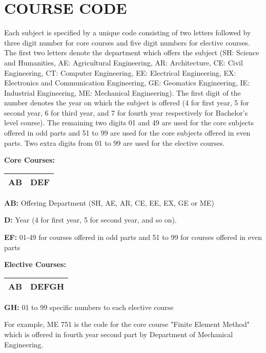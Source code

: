 \section{\uppercase{Course Code}}
Each subject is specified by a unique code consisting of two letters followed by three digit number for core courses and five digit numbers for elective courses. The first two letters denote the department which offers the subject (SH: Science and Humanities, AE: Agricultural Engineering, AR: Architecture, CE: Civil Engineering, CT: Computer Engineering, EE: Electrical Engineering, EX: Electronics and Communication Engineering, GE: Geomatics Engineering, IE: Industrial Engineering, ME: Mechanical Engineering). The first digit of the number denotes the year on which the subject is offered (4 for first year, 5 for second year, 6 for third year, and 7 for fourth year respectively for Bachelor's level course). The remaining two digits 01 and 49 are used for the core subjects offered in odd parts and 51 to 99 are used for the core subjects offered in even parts. Two extra digits from 01 to 99 are used for the elective courses.
\par
\vspace{1cm}
\noindent
\textbf{Core Courses:}
\begin{table}[h]
    
    \begin{tabular}{|c|c|}
    \hline
        \textbf{AB} & \textbf{DEF}\\
    \hline
    \end{tabular}
\end{table}
\par
\textbf{AB:} Offering Department (SH, AE, AR, CE, EE, EX, GE or ME)\par
\textbf{D:} Year (4 for first year, 5 for second year, and so on). \par
\textbf{EF:} 01-49 for courses offered in odd parts and 51 to 99 for courses offered in even parts

\par
\vspace{1cm}
\noindent
\textbf{Elective Courses:}
\begin{table}[h]
    
    \begin{tabular}{|c|c|}
    \hline
        \textbf{AB} & \textbf{DEFGH}\\
    \hline
    \end{tabular}
\end{table}
\par
\textbf{GH:} 01 to 99 specific numbers to each elective course \par
\vspace{1cm}
For example, ME 751 is the code for the core course "Finite Element Method" which is offered in fourth year second part by Department of Mechanical Engineering.


